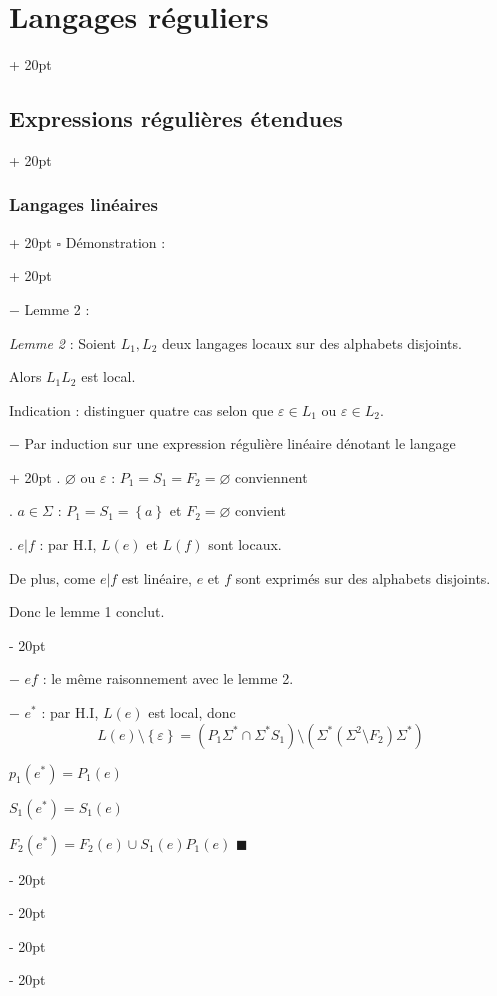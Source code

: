 \documentclass[a4paper, 12pt, twoside]{article}
\newcommand{\lr}[1]{\left( #1 \right)}
\newcommand{\set}[1]{\left\{ #1 \right\}}
\newcommand{\ind}[1][20pt]{\advance\leftskip + #1}
\newcommand{\deind}[1][20pt]{\advance\leftskip - #1}
\newenvironment{indt}[2][20pt]{#2 \par \ind[#1]}{\par \deind} %
\newenvironment{proof}[1][{Démonstration :}]{\begin{indt}{$\square$ #1}}{$\blacksquare$ \end{indt}}
\begin{document}
\begin{indt}{\section{Langages réguliers}}
\begin{indt}{\subsection{Expressions régulières étendues}}
\begin{indt}{\subsubsection{Langages linéaires}}
\begin{proof}

                    \vspace{6pt}
                    
                    $-$ Lemme 2 :
                    \begin{emphBox}
                        \textit{Lemme 2} :
                        Soient $L_1, L_2$ deux langages locaux sur des alphabets disjoints.

                        Alors $L_1 L_2$ est local.
                    \end{emphBox}


                    Indication : distinguer quatre cas selon que $\varepsilon \in L_1$ ou $\varepsilon \in L_2$.

                    \vspace{12pt}
                    
                    \begin{indt}{$-$ Par induction sur une expression régulière linéaire dénotant le langage}
                        . $\varnothing$ ou $\varepsilon$ : $P_1 = S_1 = F_2 = \varnothing$ conviennent

                        . $a \in \Sigma$ : $P_1 = S_1 = \set a$ et $F_2 = \varnothing$ convient

                        . $e | f$ : par H.I, $L(e)$ et $L(f)$ sont locaux.

                        De plus, come $e | f$ est linéaire, $e$ et $f$ sont exprimés sur des alphabets disjoints.

                        Donc le lemme 1 conclut.
                    \end{indt}

                    $-$ $ef$ : le même raisonnement avec le lemme 2.

                    $-$ $e^*$ : par H.I, $L(e)$ est local, donc
                    \[
                        L(e) \setminus \set \varepsilon =
                        \lr{P_1 \Sigma^* \cap \Sigma^* S_1} \setminus \lr{\Sigma^* \lr{\Sigma^2 \setminus F_2} \Sigma^*}
                    \]

                    $p_1(e^*) = P_1(e)$

                    $S_1(e^*) = S_1(e)$

                    $F_2(e^*) = F_2(e) \cup S_1(e) P_1(e)$
                \end{proof}


\end{indt}
\end{indt}
\end{indt}
\end{document}
